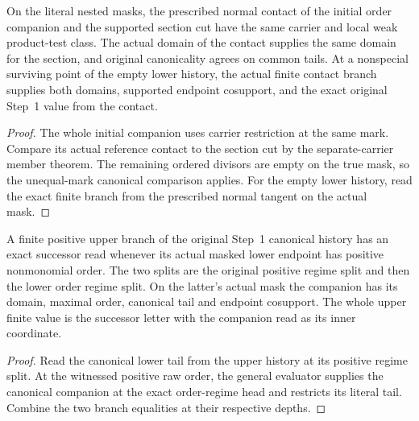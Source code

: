 \begin{theorem}
\label{hir:g1-initial-companion-prescribed-section}
\leanok
On the literal nested masks, the prescribed normal contact of the
initial order companion and the supported section cut have the
same carrier and local weak product-test class. The actual domain
of the contact supplies the same domain for the section, and
original canonicality agrees on common tails. At a nonspecial
surviving point of the empty lower history, the actual finite
contact branch supplies both domains, supported endpoint
cosupport, and the exact original Step~1 value from the contact.
\end{theorem}
\begin{proof}
The whole initial companion uses carrier restriction at the same
mark. Compare its actual reference contact to the section cut
by the separate-carrier member theorem. The remaining ordered
divisors are empty on the true mask, so the unequal-mark
canonical comparison applies. For the empty lower history, read
the exact finite branch from the prescribed normal tangent on
the actual mask.
\end{proof}

\begin{theorem}
\label{hir:g1-original-later-positive-successor-read}
\leanok
A finite positive upper branch of the original Step~1 canonical
history has an exact successor read whenever its actual masked
lower endpoint has positive nonmonomial order. The two splits
are the original positive regime split and then the lower order
regime split. On the latter's actual mask the companion has its
domain, maximal order, canonical tail and endpoint cosupport.
The whole upper finite value is the successor letter with the
companion read as its inner coordinate.
\end{theorem}
\begin{proof}
Read the canonical lower tail from the upper history at its
positive regime split. At the witnessed positive raw order, the
general evaluator supplies the canonical companion at the exact
order-regime head and restricts its literal tail. Combine the two
branch equalities at their respective depths.
\end{proof}


